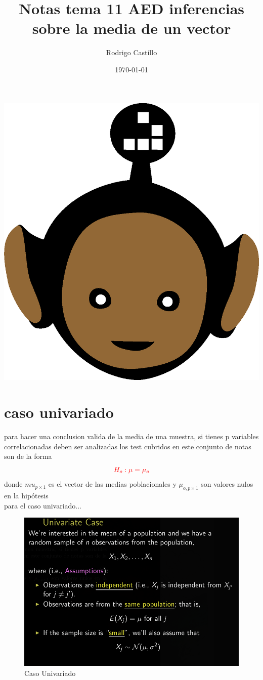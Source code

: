 \documentclass[10pt,a4paper]{article} %
\begin{document}
    \title{{  Notas tema 11 AED inferencias sobre la media de un vector  }}
    \author{{Rodrigo Castillo}}
    \date{\today}

    \maketitle


    \includegraphics[width=0.1\linewidth]{negro_cara.png}
    \section{caso univariado}
        para hacer una conclusion valida de la media de una muestra, si tienes
        p variables correlacionadas deben ser analizadas
        los test cubridos en este conjunto de notas son de la forma
        \begin{equation}
            \color{red}  H_o: \mu = \mu _o    \color{white}
        \end{equation}
        donde $ mu_{p \times 1}   $ es el vector de las medias poblacionales y
        $ \mu _{o,p \times 1}   $ son valores nulos en la hipótesis
        \\
        para el caso univariado...
        \begin{figure}[h!]
            \centering
            \includegraphics[width=0.8\linewidth]{univariado.png}
            \caption{Caso Univariado}
            \label{univariado}
        \end{figure}
\end{document}
